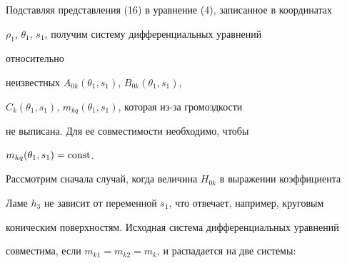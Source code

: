 Подставляя представления (16) в уравнение (4), записанное в координатах  


$\rho_1$, $\theta_1$, $s_1$, получим систему дифференциальных уравнений 


относительно  


неизвестных $A_{0k}(\theta_1,s_1)$, $B_{0k}(\theta_1,s_1)$, 


$C_{k}(\theta_1,s_1)$, $m_{kq}(\theta_1,s_1)$, которая из-за громоздкости  


не выписана. Для ее совместимости необходимо, чтобы 


$m_{kq}(\theta_1,s_1)=\operatorname{const}$. 


Рассмотрим сначала случай, когда величина $H_{0k}$ в выражении коэффициента  


Ламе $h_3$ не зависит от переменной $s_1$, что отвечает, например, круговым  


коническим поверхностям. Исходная система дифференциальных уравнений  


совместима, если $m_{k1}=m_{k2}=m_k$, и распадается на две системы: 


